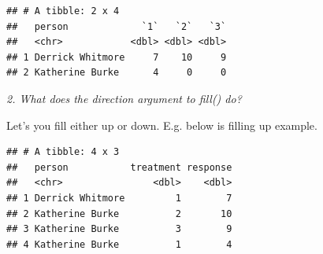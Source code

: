 \documentclass[]{book}
\newenvironment{Shaded}{\begin{snugshade}}{\end{snugshade}}
\newcommand{\DataTypeTok}[1]{\textcolor[rgb]{0.13,0.29,0.53}{#1}}
\newcommand{\DecValTok}[1]{\textcolor[rgb]{0.00,0.00,0.81}{#1}}
\newcommand{\KeywordTok}[1]{\textcolor[rgb]{0.13,0.29,0.53}{\textbf{#1}}}
\newcommand{\NormalTok}[1]{#1}
\newcommand{\OperatorTok}[1]{\textcolor[rgb]{0.81,0.36,0.00}{\textbf{#1}}}
\newcommand{\OtherTok}[1]{\textcolor[rgb]{0.56,0.35,0.01}{#1}}
\newcommand{\StringTok}[1]{\textcolor[rgb]{0.31,0.60,0.02}{#1}}
\theoremstyle{definition}
\theoremstyle{definition}
\theoremstyle{definition}
\theoremstyle{remark}
\begin{document}
\begin{Shaded}
\end{Shaded}

\begin{verbatim}
## # A tibble: 2 x 4
##   person             `1`   `2`   `3`
##   <chr>            <dbl> <dbl> <dbl>
## 1 Derrick Whitmore     7    10     9
## 2 Katherine Burke      4     0     0
\end{verbatim}

\emph{2. What does the direction argument to fill() do?}

Let's you fill either up or down. E.g. below is filling up example.

\begin{Shaded}
\end{Shaded}

\begin{verbatim}
## # A tibble: 4 x 3
##   person           treatment response
##   <chr>                <dbl>    <dbl>
## 1 Derrick Whitmore         1        7
## 2 Katherine Burke          2       10
## 3 Katherine Burke          3        9
## 4 Katherine Burke          1        4
\end{verbatim}
\end{document}
